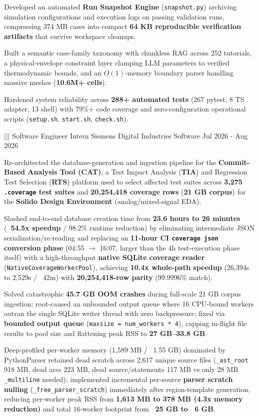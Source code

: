 {{        \item Developed an automated \textbf{Run Snapshot Engine} (\texttt{snapshot.py}) archiving simulation configurations and execution logs on passing validation runs, compressing 374 MB cases into compact \textbf{64 KB reproducible verification artifacts} that survive workspace cleanups.
        \item Built a semantic case-family taxonomy with chunkless RAG across 252 tutorials, a physical-envelope constraint layer clamping LLM parameters to verified thermodynamic bounds, and an $O(1)$-memory boundary parser handling massive meshes (\textbf{10.6M+ cells}).
        \item Hardened system reliability across \textbf{288+ automated tests} (267 pytest, 8 TS adapter, 13 shell) with 79\%+ code coverage and zero-configuration operational scripts (\texttt{setup.sh}, \texttt{start.sh}, \texttt{check.sh}).
    }%
    |||
    {Software Engineer Intern}%
    {Siemens Digital Industries Software}%
    {Jul 2026 - Aug 2026}%
    {%
        \item Re-architected the database-generation and ingestion pipeline for the \textbf{Commit-Based Analysis Tool (CAT)}, a Test Impact Analysis (\textbf{TIA}) and Regression Test Selection (\textbf{RTS}) platform used to select affected test suites across \textbf{3,275 \texttt{.coverage} test suites} and \textbf{20,254,418 coverage rows} (\textbf{21 GB corpus}) for the \textbf{Solido Design Environment} (analog/mixed-signal EDA).
        \item Slashed end-to-end database creation time from \textbf{23.6 hours to 26 minutes} (\textbf{~54.5x speedup} / 98.2\% runtime reduction) by eliminating intermediate JSON serialization/re-reading and replacing an \textbf{11-hour CI \texttt{coverage json} conversion phase} (04:55 $\to$ 16:07, larger than the 4h test-execution phase itself) with a high-throughput \textbf{native SQLite coverage reader} (\texttt{NativeCoverageWorkerPool}), achieving \textbf{10.4x whole-path speedup} (26,394s to 2,529s / ~42m) with \textbf{20,254,418-row parity} (99.9996\% match).
        \item Solved catastrophic \textbf{45.7 GB OOM crashes} during full-scale 21 GB corpus ingestion: root-caused an unbounded output queue where 16 CPU-bound workers outran the single SQLite writer thread with zero backpressure; fixed via \textbf{bounded output queue} (\texttt{maxsize = num\_workers * 4}), capping in-flight file results to pool size and flattening peak RSS to \textbf{27 GB--33.8 GB}.
        \item Deep-profiled per-worker memory (1,589 MB / ~1.55 GB) dominated by PythonParser retained dead scratch across 2,617 unique source files (\texttt{\_ast\_root} 918 MB, dead arcs 223 MB, dead source/statements 117 MB vs only 28 MB \texttt{\_multiline} needed); implemented incremental per-source \textbf{parser scratch nulling} (\texttt{\_free\_parser\_scratch}) immediately after region-template generation, reducing per-worker peak RSS from \textbf{1,613 MB to 378 MB (4.3x memory reduction)} and total 16-worker footprint from \textbf{~25 GB to ~6 GB}.
}}
